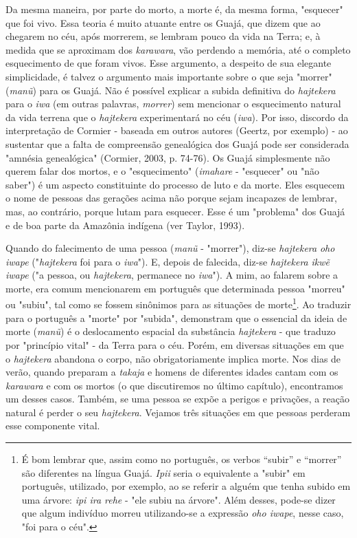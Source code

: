 Da mesma maneira, por parte do morto, a morte é, da mesma forma,
"esquecer" que foi vivo. Essa teoria é muito atuante entre os Guajá, que
dizem que ao chegarem no céu, após morrerem, se lembram pouco da vida na
Terra; e, à medida que se aproximam dos \emph{karawara}, vão perdendo a
memória, até o completo esquecimento de que foram vivos. Esse argumento,
a despeito de sua elegante simplicidade, é talvez o argumento mais
importante sobre o que seja "morrer" (\emph{manũ}) para os Guajá. Não é
possível explicar a subida definitiva do \emph{hajtekera} para o
\emph{iwa} (em outras palavras, \emph{morrer}) sem mencionar o
esquecimento natural da vida terrena que o \emph{hajtekera}
experimentará no céu (\emph{iwa}). Por isso, discordo da interpretação
de Cormier - baseada em outros autores (Geertz, por exemplo) - ao
sustentar que a falta de compreensão genealógica dos Guajá pode ser
considerada "amnésia genealógica" (Cormier, 2003, p. 74-76). Os Guajá
simplesmente não querem falar dos mortos, e o "esquecimento"
(\emph{imahare} - "esquecer" ou "não saber") é um aspecto constituinte
do processo de luto e da morte. Eles esquecem o nome de pessoas das
gerações acima não porque sejam incapazes de lembrar, mas, ao contrário,
porque lutam para esquecer. Esse é um "problema" dos Guajá e de boa
parte da Amazônia indígena (ver Taylor, 1993).

Quando do falecimento de uma pessoa (\emph{manũ} - "morrer"), diz-se
\emph{hajtekera} \emph{oho iwape} ("\emph{hajtekera} foi para o
\emph{iwa}"). E, depois de falecida, diz-se \emph{hajtekera} \emph{ikwẽ
iwape} ("a pessoa, ou \emph{hajtekera}, permanece no \emph{iwa}"). A
mim, ao falarem sobre a morte, era comum mencionarem em português que
determinada pessoa "morreu" ou "subiu", tal como se fossem sinônimos
para as situações de morte\footnote{É bom lembrar que, assim como no
  português, os verbos ``subir'' e ``morrer'' são diferentes na língua
  Guajá. \emph{Ipii} seria o equivalente a "subir" em português,
  utilizado, por exemplo, ao se referir a alguém que tenha subido em uma
  árvore: \emph{ipi ira rehe} - "ele subiu na árvore". Além desses,
  pode-se dizer que algum indivíduo morreu utilizando-se a expressão
  \emph{oho iwape}, nesse caso, "foi para o céu".}. Ao traduzir para o
português a "morte" por "subida", demonstram que o essencial da ideia de
morte (\emph{manũ}) é o deslocamento espacial da substância
\emph{hajtekera} - que traduzo por "princípio vital" - da Terra para o
céu. Porém, em diversas situações em que o \emph{hajtekera} abandona o
corpo, não obrigatoriamente implica morte. Nos dias de verão, quando
preparam a \emph{takaja} e homens de diferentes idades cantam com os
\emph{karawara} e com os mortos (o que discutiremos no último capítulo),
encontramos um desses casos. Também, se uma pessoa se expõe a perigos e
privações, a reação natural é perder o seu \emph{hajtekera}. Vejamos
três situações em que pessoas perderam esse componente vital.

